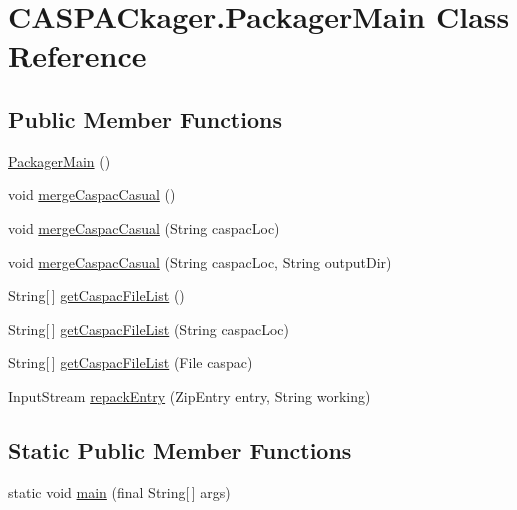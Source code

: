 \hypertarget{classCASPACkager_1_1PackagerMain}{\section{C\-A\-S\-P\-A\-Ckager.\-Packager\-Main Class Reference}
\label{classCASPACkager_1_1PackagerMain}
}
\subsection*{Public Member Functions}
\begin{DoxyCompactItemize}
\item 
\hyperlink{classCASPACkager_1_1PackagerMain_a5feeab84510603114e4cd16af557183f}{Packager\-Main} ()
\item 
void \hyperlink{classCASPACkager_1_1PackagerMain_a4e8e02f802540050d3f1a074a9f4b411}{merge\-Caspac\-Casual} ()
\item 
void \hyperlink{classCASPACkager_1_1PackagerMain_a32df460e9180f81a54b7d7a3c38215cc}{merge\-Caspac\-Casual} (String caspac\-Loc)
\item 
void \hyperlink{classCASPACkager_1_1PackagerMain_ab3e1a27e66331e67b19ae4809480f46a}{merge\-Caspac\-Casual} (String caspac\-Loc, String output\-Dir)
\item 
String\mbox{[}$\,$\mbox{]} \hyperlink{classCASPACkager_1_1PackagerMain_afdf339fc0283b3cf6418de0e59732762}{get\-Caspac\-File\-List} ()
\item 
String\mbox{[}$\,$\mbox{]} \hyperlink{classCASPACkager_1_1PackagerMain_ae9bf358f30038bfb45e7de7bf2c3c0a6}{get\-Caspac\-File\-List} (String caspac\-Loc)
\item 
String\mbox{[}$\,$\mbox{]} \hyperlink{classCASPACkager_1_1PackagerMain_aa741699d712b8b9cecb5a6782838413d}{get\-Caspac\-File\-List} (File caspac)
\item 
Input\-Stream \hyperlink{classCASPACkager_1_1PackagerMain_aac9b44ae631f522eb53efce869f3a5c5}{repack\-Entry} (Zip\-Entry entry, String working)
\end{DoxyCompactItemize}
\subsection*{Static Public Member Functions}
\begin{DoxyCompactItemize}
\item 
static void \hyperlink{classCASPACkager_1_1PackagerMain_ab65464d17a9ed1557137ca0fc128f320}{main} (final String\mbox{[}$\,$\mbox{]} args)
\end{DoxyCompactItemize}

